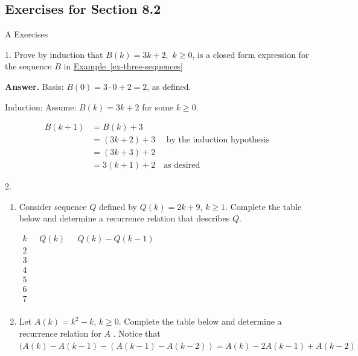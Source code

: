 \documentclass[10pt,]{book}
\theoremstyle{plain}
\theoremstyle{definition}
\theoremstyle{definition}
\theoremstyle{definition}
\theoremstyle{definition}
\numberwithin{equation}{section}
\begin{document}
\subsection[Exercises for Section 8.2]{Exercises for Section 8.2}\label{exercises-8-2}
\hypertarget{exercisegroup-3}{}\typeout{************************************************}
\typeout{************************************************}
A Exercises%
\begin{exercisegroup}
\item[1.]\hypertarget{exercise-7}{} Prove by induction that \(B(k) = 3k + 2,\) \(k\geq 0\), is a closed form expression for the sequence \(B\) in \hyperref[ex-three-sequences]{Example~\ref{ex-three-sequences}}%
\par\smallskip
\par\smallskip
\noindent\textbf{Answer.}\hypertarget{answer-4}{}\quad
Basis: \(B(0)=3\cdot 0+2=2\), as defined.%
\par
Induction: Assume: \(B(k)=3k+2\) for some \(k\geq 0\).

\begin{equation*}
\begin{split}
B(k+1) &=B(k)+3\\
		&=(3k+2)+3\quad \textrm{ by the induction hypothesis} \\
		&=(3k+3)+2\\
		&=3(k+1)+2\quad \textrm{as desired}
\end{split}
\end{equation*}
%
\item[2.]\hypertarget{exercise-8}{}\leavevmode%
\begin{enumerate}[label=\alph*]
\item\hypertarget{li-24}{}Consider sequence \(Q\) defined by \(Q(k) = 2k + 9\), \(k \geq  1\). Complete the table below and determine a recurrence relation
that describes \(Q\). 



\(\begin{array}{ccc}
 k & \text{     }Q(k)\text{     } & Q(k)-Q(k-1) \\
 2 &   &   \\
 3 &   &   \\
 4 & \text{  } &   \\
 5 &   &   \\
 6 &   &   \\
 7 &   &   \\
\end{array}\)
%
\item\hypertarget{li-25}{} Let \(A(k) = k^2 - k\), \(k \geq  0\). Complete the table below and determine a recurrence relation for \(A\) . Notice
that  \((A(k)-A(k-1)-(A(k-1)-A(k-2)) =A(k)-2A(k-1)+A(k-2)\)




\end{enumerate}
\end{exercisegroup}
\end{document}
